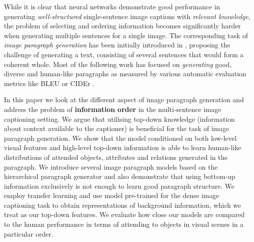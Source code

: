 \documentclass[11pt,a4paper]{article}
\begin{document}
While it is clear that neural networks demonstrate good performance in generating \textit{well-structured} single-sentence image captions with \textit{relevant knowledge}, the problem of selecting and ordering information becomes significantly harder when generating multiple sentences for a single image. The corresponding task of
\textit{image paragraph generation} has been initially introduced in , proposing the challenge of generating a text, consisting of several sentences that would form a coherent whole.
Most of the following work \cite{liang2017recurrent,chatterjee2018diverse,wang2019convolutional} has focused on \textit{generating} good, diverse and human-like paragraphs as measured by various automatic evaluation metrics like BLEU \cite{bleu} or CIDEr \cite{vedantam2014cider}.

In this paper we look at the different aspect of image paragraph generation and address the problem of \textbf{information order} in the multi-sentence image captioning setting.
We argue that utilising top-down knowledge (information about context available to the captioner) is beneficial for the task of image paragraph generation.
We show that the model conditioned on both low-level visual features and high-level top-down information is able to learn human-like distributions of attended objects, attributes and relations generated in the paragraph.
We introduce several image paragraph models based on the hierarchical paragraph generator  and also
demonstrate that using bottom-up information exclusively is not enough to learn good paragraph structure.
We employ transfer learning and use model pre-trained for the dense image captioning task \cite{densecap} to obtain representations of background information, which we treat as our top-down features.
We evaluate how close our models are compared to the human performance in terms of attending to objects in visual scenes in a particular order.

\fi

\end{document}
